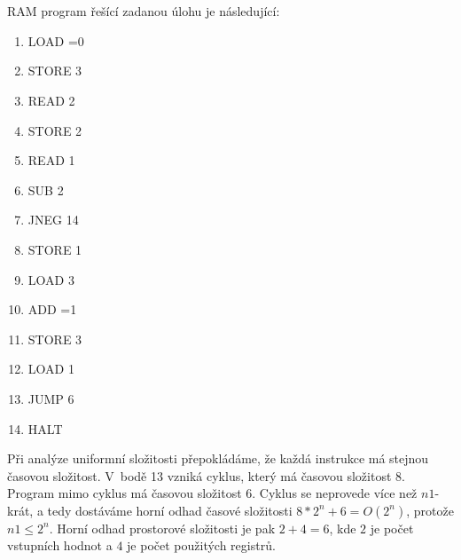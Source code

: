 \documentclass[a4paper]{article}
\begin{document}
\section*{}
RAM program řešící zadanou úlohu je následující:
\begin{enumerate}
    \item LOAD =0
    \item STORE 3
    \item READ 2
    \item STORE 2
    \item READ 1
    \item SUB 2
    \item JNEG 14
    \item STORE 1
    \item LOAD 3
    \item ADD =1
    \item STORE 3
    \item LOAD 1
    \item JUMP 6
    \item HALT
\end{enumerate}

Při analýze uniformní složitosti přepokládáme, že každá instrukce má stejnou časovou složitost.
V~bodě 13 vzniká cyklus, který má časovou složitost $8$. Program mimo cyklus má časovou složitost $6$.
Cyklus se neprovede více než $n1$-krát, a tedy dostáváme horní odhad časové složitosti $8*2^n+6=O(2^{n})$,
protože $n1 \leq 2^n$.
Horní odhad prostorové složitosti je pak $2+4=6$, kde $2$ je počet vstupních hodnot a $4$ je počet použitých registrů. 
\end{document}

